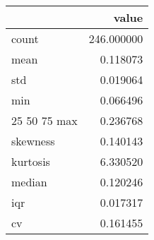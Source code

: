 \begin{tabular}{lr}
\toprule
 & value \\
\midrule
count & 246.000000 \\
mean & 0.118073 \\
std & 0.019064 \\
min & 0.066496 \\
25%
50%
75%
max & 0.236768 \\
skewness & 0.140143 \\
kurtosis & 6.330520 \\
median & 0.120246 \\
iqr & 0.017317 \\
cv & 0.161455 \\
\bottomrule
\end{tabular}
